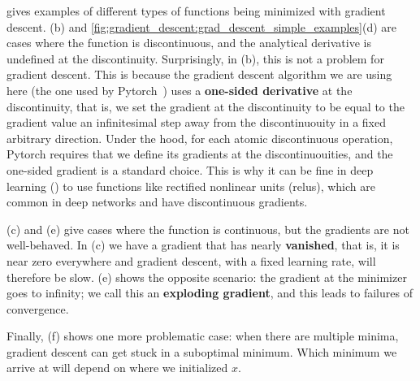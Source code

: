 \Fig{\ref{fig:gradient_descent:grad_descent_simple_examples}} gives examples of different types of functions being minimized with gradient descent. \Figs{\ref{fig:gradient_descent:grad_descent_simple_examples}}(b) and \ref{fig:gradient_descent:grad_descent_simple_examples}(d) are cases where the function is discontinuous, and the analytical derivative is undefined at the discontinuity. Surprisingly, in \fig{\ref{fig:gradient_descent:grad_descent_simple_examples}}(b), this is not a problem for gradient descent. This is because the gradient descent algorithm we are using here (the one used by Pytorch~\cite{paszke2019pytorch}) uses a \textbf{one-sided derivative} at the discontinuity, that is, we set the gradient at the discontinuity to be equal to the gradient value an infinitesimal step away from the discontinuouity in a fixed arbitrary direction. Under the hood, for each atomic discontinuous operation, Pytorch requires that we define its gradients at the discontinuouities, and the one-sided gradient is a standard choice. This is why it can be fine in deep learning (\chap{\ref{chapter:neural_nets}}) to use functions like rectified nonlinear units (relus), which are common in deep networks and have discontinuous gradients.

\Figs{\ref{fig:gradient_descent:grad_descent_simple_examples}}(c) and (e) give cases where the function is continuous, but the gradients are not well-behaved. In \fig{\ref{fig:gradient_descent:grad_descent_simple_examples}}(c) we have a gradient that has nearly \textbf{vanished}, that is, it is near zero everywhere and gradient descent, with a fixed learning rate, will therefore be slow. \Fig{\ref{fig:gradient_descent:grad_descent_simple_examples}}(e) shows the opposite scenario: the gradient at the minimizer goes to infinity; we call this an \textbf{exploding gradient}, and this leads to failures of convergence.

Finally, \fig{\ref{fig:gradient_descent:grad_descent_simple_examples}}(f) shows one more problematic case: when there are multiple minima, gradient descent can get stuck in a suboptimal minimum. Which minimum we arrive at will depend on where we initialized $x$.


